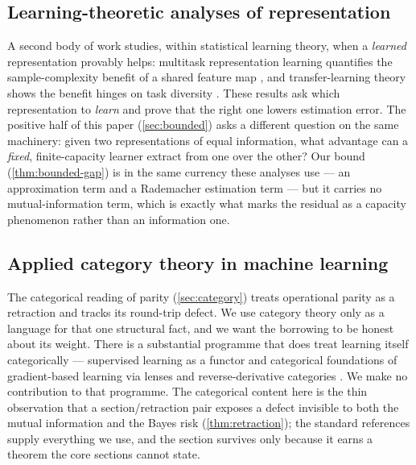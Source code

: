 \subsection{Learning-theoretic analyses of representation}
\label{subsec:rw-learning}

A second body of work studies, within statistical learning theory, when a
\emph{learned} representation provably helps: multitask representation learning
quantifies the sample-complexity benefit of a shared feature map
\citep{maurer2016multitask}, and transfer-learning theory shows the benefit hinges
on task diversity \citep{tripuraneni2021taskdiversity}. These results ask which
representation to \emph{learn} and prove that the right one lowers estimation
error. The positive half of this paper (\cref{sec:bounded}) asks a different
question on the same machinery: given two representations of equal information,
what advantage can a \emph{fixed}, finite-capacity learner extract from one over
the other? Our bound (\cref{thm:bounded-gap}) is in the same currency these
analyses use --- an approximation term and a Rademacher estimation term
\citep{bartlettmendelson2002, shalevshwartz2014, mohri2018} --- but it carries no
mutual-information term, which is exactly what marks the residual as a capacity
phenomenon rather than an information one.

\subsection{Applied category theory in machine learning}
\label{subsec:rw-cat}

The categorical reading of parity (\cref{sec:category}) treats operational parity as a
retraction and tracks its round-trip defect. We use category theory only as a
language for that one structural fact, and we want the borrowing to be honest
about its weight. There is a substantial programme that does treat learning
itself categorically --- supervised learning as a functor
\citep{fong2019backpropfunctor} and categorical foundations of gradient-based
learning via lenses and reverse-derivative categories
\citep{cruttwell2022categorical}. We make no contribution to that programme. The
categorical content here is the thin observation that a section/retraction pair
exposes a defect invisible to both the mutual information and the Bayes risk
(\cref{thm:retraction}); the standard references \citep{maclane1998, riehl2016,
awodey2010} supply everything we use, and the section survives only because it
earns a theorem the core sections cannot state.

